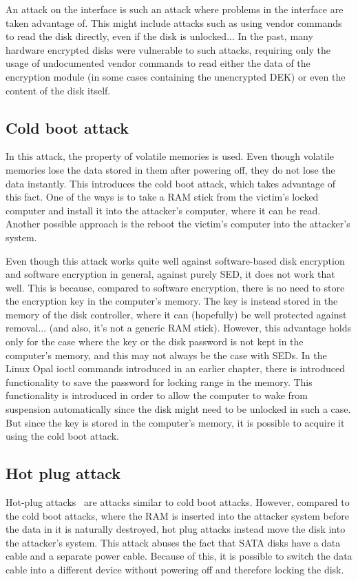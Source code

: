 An attack on the interface is such an attack where problems in the interface are taken advantage of.
This might include attacks such as using vendor commands to read the disk directly, even if the disk is unlocked... In the past, many hardware encrypted disks were vulnerable to such attacks, requiring only the usage of undocumented vendor commands to read either the data of the encryption module (in some cases containing the unencrypted DEK) or even the content of the disk itself.

\subsection{Cold boot attack}

In this attack, the property of volatile memories is used. Even though volatile memories lose the data stored in them after powering off, they do not lose the data instantly. This introduces the cold boot attack, which takes advantage of this fact. One of the ways is to take a RAM stick from the victim's locked computer and install it into the attacker's computer, where it can be read. Another possible approach is the reboot the victim's computer into the attacker's system.

Even though this attack works quite well against software-based disk encryption and software encryption in general, against purely SED, it does not work that well. This is because, compared to software encryption, there is no need to store the encryption key in the computer's memory. The key is instead stored in the memory of the disk controller, where it can (hopefully) be well protected against removal... (and also, it's not a generic RAM stick). However, this advantage holds only for the case where the key or the disk password is not kept in the computer's memory, and this may not always be the case with SEDs. In the Linux Opal ioctl commands introduced in an earlier chapter, there is introduced functionality to save the password for locking range in the memory. This functionality is introduced in order to allow the computer to wake from suspension automatically since the disk might need to be unlocked in such a case. But since the key is stored in the computer's memory, it is possible to acquire it using the cold boot attack.

\subsection{Hot plug attack}

Hot-plug attacks~\cite{Mller2013SelfEncryptingDP} are attacks similar to cold boot attacks. However, compared to the cold boot attacks, where the RAM is inserted into the attacker system before the data in it is naturally destroyed, hot plug attacks instead move the disk into the attacker's system. This attack abuses the fact that SATA disks have a data cable and a separate power cable. Because of this, it is possible to switch the data cable into a different device without powering off and therefore locking the disk.

